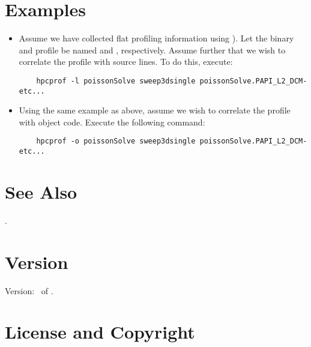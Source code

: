 \documentclass[english]{article}
\begin{document}
\section{Examples}

\begin{itemize}

\item Assume we have collected flat profiling information using  ).
Let the binary and profile be named  and , respectively.
Assume further that we wish to correlate the profile with source lines.
To do this, execute:
\begin{verbatim}
    hpcprof -l poissonSolve sweep3dsingle poissonSolve.PAPI_L2_DCM-etc...
\end{verbatim}

\item Using the same example as above, assume we wish to correlate the profile with object code.  Execute the following command:
\begin{verbatim}
    hpcprof -o poissonSolve sweep3dsingle poissonSolve.PAPI_L2_DCM-etc...
\end{verbatim}

\end{itemize}


\section{See Also}

.

\section{Version}

Version: \Version\ of \Date.

\section{License and Copyright}
\end{document}
